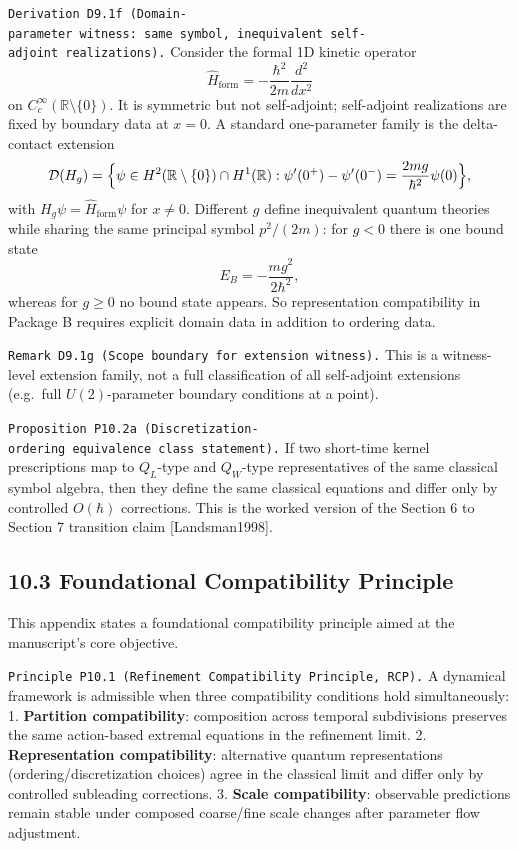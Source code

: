\documentclass[
]{article}
\begin{document}
\texttt{Derivation\ D9.1f\ (Domain-parameter\ witness:\ same\ symbol,\ inequivalent\ self-adjoint\ realizations).}
Consider the formal 1D kinetic operator \[
\widehat H_{\mathrm{form}}=-\frac{\hbar^2}{2m}\frac{d^2}{dx^2}
\] on \(C_c^\infty(\mathbb R\setminus\{0\})\). It is symmetric but not
self-adjoint; self-adjoint realizations are fixed by boundary data at
\(x=0\). A standard one-parameter family is the delta-contact extension
\[
\mathcal D(H_g)=\Bigl\{\psi\in H^2(\mathbb R\setminus\{0\})\cap H^1(\mathbb R):
\psi'(0^+)-\psi'(0^-)=\frac{2mg}{\hbar^2}\psi(0)\Bigr\},
\] with \(H_g\psi=\widehat H_{\mathrm{form}}\psi\) for \(x\neq0\).
Different \(g\) define inequivalent quantum theories while sharing the
same principal symbol \(p^2/(2m)\): for \(g<0\) there is one bound state
\[
E_B=-\frac{m g^2}{2\hbar^2},
\] whereas for \(g\ge0\) no bound state appears. So representation
compatibility in Package B requires explicit domain data in addition to
ordering data.

\texttt{Remark\ D9.1g\ (Scope\ boundary\ for\ extension\ witness).} This
is a witness-level extension family, not a full classification of all
self-adjoint extensions (e.g.~full \(U(2)\)-parameter boundary
conditions at a point).

\texttt{Proposition\ P10.2a\ (Discretization-ordering\ equivalence\ class\ statement).}
If two short-time kernel prescriptions map to \(Q_L\)-type and
\(Q_W\)-type representatives of the same classical symbol algebra, then
they define the same classical equations and differ only by controlled
\(O(\hbar)\) corrections. This is the worked version of the Section 6 to
Section 7 transition claim {[}Landsman1998{]}.

\hypertarget{foundational-compatibility-principle}{%
\subsection{10.3 Foundational Compatibility
Principle}\label{foundational-compatibility-principle}}

This appendix states a foundational compatibility principle aimed at the
manuscript's core objective.

\texttt{Principle\ P10.1\ (Refinement\ Compatibility\ Principle,\ RCP).}
A dynamical framework is admissible when three compatibility conditions
hold simultaneously: 1. \textbf{Partition compatibility}: composition
across temporal subdivisions preserves the same action-based extremal
equations in the refinement limit. 2. \textbf{Representation
compatibility}: alternative quantum representations
(ordering/discretization choices) agree in the classical limit and
differ only by controlled subleading corrections. 3. \textbf{Scale
compatibility}: observable predictions remain stable under composed
coarse/fine scale changes after parameter flow adjustment.
\end{document}
